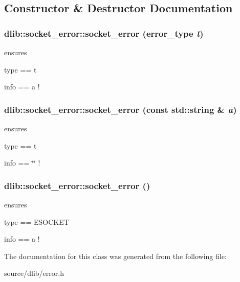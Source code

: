\subsection{Constructor \& Destructor Documentation}
\hypertarget{classdlib_1_1socket__error_a0a9b8d66ac787773c3e1d7e19421d6f2}{
\subsubsection[{socket\_\-error}]{\setlength{\rightskip}{0pt plus 5cm}dlib::socket\_\-error::socket\_\-error (error\_\-type {\em t})}}
\label{classdlib_1_1socket__error_a0a9b8d66ac787773c3e1d7e19421d6f2}
ensures
\begin{DoxyItemize}
\item type == t
\item info == a ! 
\end{DoxyItemize}\hypertarget{classdlib_1_1socket__error_a894c0c5dbe99a8f6733b875e3913e54a}{
\subsubsection[{socket\_\-error}]{\setlength{\rightskip}{0pt plus 5cm}dlib::socket\_\-error::socket\_\-error (const std::string \& {\em a})}}
\label{classdlib_1_1socket__error_a894c0c5dbe99a8f6733b875e3913e54a}
ensures
\begin{DoxyItemize}
\item type == t
\item info == \char`\"{}\char`\"{} ! 
\end{DoxyItemize}\hypertarget{classdlib_1_1socket__error_a618d1588da7ee235b1d143ce177d5dd8}{
\subsubsection[{socket\_\-error}]{\setlength{\rightskip}{0pt plus 5cm}dlib::socket\_\-error::socket\_\-error ()}}
\label{classdlib_1_1socket__error_a618d1588da7ee235b1d143ce177d5dd8}
ensures
\begin{DoxyItemize}
\item type == ESOCKET
\item info == a ! 
\end{DoxyItemize}

The documentation for this class was generated from the following file:\begin{DoxyCompactItemize}
\item 
source/dlib/error.h\end{DoxyCompactItemize}

